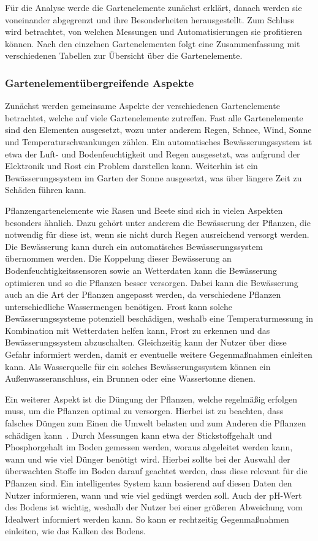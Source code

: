 Für die Analyse werde die Gartenelemente zunächst erklärt, danach werden sie voneinander abgegrenzt und ihre Besonderheiten herausgestellt.
Zum Schluss wird betrachtet, von welchen Messungen und Automatisierungen sie profitieren können.
Nach den einzelnen Gartenelementen folgt eine Zusammenfassung mit verschiedenen Tabellen zur Übersicht über die Gartenelemente.

\subsubsection{Gartenelementübergreifende Aspekte}
Zunächst werden gemeinsame Aspekte der verschiedenen Gartenelemente betrachtet, welche auf viele Gartenelemente zutreffen.
Fast alle Gartenelemente sind den Elementen ausgesetzt, wozu unter anderem Regen, Schnee, Wind, Sonne und Temperaturschwankungen zählen.
Ein automatisches Bewässerungssystem ist etwa der Luft- und Bodenfeuchtigkeit und Regen ausgesetzt, was aufgrund der Elektronik und Rost ein Problem darstellen kann.
Weiterhin ist ein Bewässerungssystem im Garten der Sonne ausgesetzt, was über längere Zeit zu Schäden führen kann.

Pflanzengartenelemente wie Rasen und Beete sind sich in vielen Aspekten besonders ähnlich.
Dazu gehört unter anderem die Bewässerung der Pflanzen, die notwendig für diese ist, wenn sie nicht durch Regen ausreichend versorgt werden.
Die Bewässerung kann durch ein automatisches Bewässerungssystem übernommen werden.
Die Koppelung dieser Bewässerung an Bodenfeuchtigkeitssensoren sowie an Wetterdaten kann die Bewässerung optimieren und so die Pflanzen besser versorgen.
Dabei kann die Bewässerung auch an die Art der Pflanzen angepasst werden, da verschiedene Pflanzen unterschiedliche Wassermengen benötigen.
Frost kann solche Bewässerungssysteme potenziell beschädigen, weshalb eine Temperaturmessung in Kombination mit Wetterdaten helfen kann, Frost zu erkennen und das Bewässerungssystem abzuschalten.
Gleichzeitig kann der Nutzer über diese Gefahr informiert werden, damit er eventuelle weitere Gegenmaßnahmen einleiten kann.
Als Wasserquelle für ein solches Bewässerungssystem können ein Außenwasseranschluss, ein Brunnen oder eine Wassertonne dienen.

Ein weiterer Aspekt ist die Düngung der Pflanzen, welche regelmäßig erfolgen muss, um die Pflanzen optimal zu versorgen.
Hierbei ist zu beachten, dass falsches Düngen zum Einen die Umwelt belasten und zum Anderen die Pflanzen schädigen kann~\cite{RasenDuenger}.
Durch Messungen kann etwa der Stickstoffgehalt und Phosphorgehalt im Boden gemessen werden, woraus abgeleitet werden kann, wann und wie viel Dünger benötigt wird.
Hierbei sollte bei der Auswahl der überwachten Stoffe im Boden darauf geachtet werden, dass diese relevant für die Pflanzen sind.
Ein intelligentes System kann basierend auf diesen Daten den Nutzer informieren, wann und wie viel gedüngt werden soll.
Auch der pH-Wert des Bodens ist wichtig, weshalb der Nutzer bei einer größeren Abweichung vom Idealwert informiert werden kann.
So kann er rechtzeitig Gegenmaßnahmen einleiten, wie das Kalken des Bodens.

